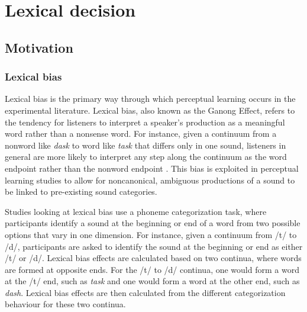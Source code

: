 
\chapter{Lexical decision}


\section{Motivation}

\subsection{Lexical bias}

Lexical bias is the primary way through which perceptual learning occurs in the experimental literature.  
Lexical bias, also known as the Ganong Effect, refers to the tendency for listeners to interpret a speaker's production as a meaningful word rather than a nonsense word.  
For instance, given a continuum from a nonword like \emph{dask} to word like \emph{task} that differs only in one sound, listeners in general are more likely to interpret any step along the continuum as the word endpoint rather than the nonword endpoint \citep{Ganong1980}. 
This bias is exploited in perceptual learning studies to allow for noncanonical, ambiguous productions of a sound to be linked to pre-existing sound categories.

Studies looking at lexical bias use a phoneme categorization task, where participants identify a sound at the beginning or end of a word from two possible options that vary in one dimension.  
For instance, given a continuum from /t/ to /d/, participants are asked to identify the sound at the beginning or end as either /t/ or /d/. 
Lexical bias effects are calculated based on two continua, where words are formed at opposite ends. 
For the /t/ to /d/ continua, one would form a word at the /t/ end, such as \emph{task} and one would form a word at the other end, such as \emph{dash}.  
Lexical bias effects are then calculated from the different categorization behaviour for these two continua.

